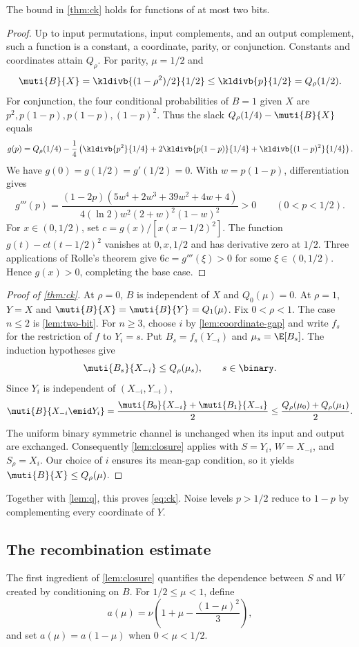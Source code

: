 \begin{lemma}\label{lem:two-bit}
The bound in \autoref{thm:ck} holds for functions of at most two bits.
\end{lemma}
\begin{proof}
Up to input permutations, input complements, and an output complement,
such a function is a constant, a coordinate, parity, or conjunction.
Constants and coordinates attain $Q_\rho$. For parity, $\mu=1/2$ and
\[
 \muti{B}{X}=\kldivb{(1-\rho^2)/2}{1/2}
 \le\kldivb{p}{1/2}=Q_\rho(1/2).
\]
For conjunction, the four conditional probabilities of $B=1$ given
$X$ are $p^2,p(1-p),p(1-p),(1-p)^2$. Thus the slack
$Q_\rho(1/4)-\muti{B}{X}$ equals
\[
 g(p)=Q_\rho(1/4)-\frac14\left(
 \kldivb{p^2}{1/4}+2\kldivb{p(1-p)}{1/4}
 +\kldivb{(1-p)^2}{1/4}\right).
\]
We have $g(0)=g(1/2)=g'(1/2)=0$. With $w=p(1-p)$,
differentiation gives
\[
 g'''(p)=\frac{(1-2p)(5w^4+2w^3+39w^2+4w+4)}
 {4(\ln2)w^2(2+w)^2(1-w)^2}>0
 \qquad(0<p<1/2).
\]
For $x\in(0,1/2)$, set $c=g(x)/[x(x-1/2)^2]$.
The function $g(t)-ct(t-1/2)^2$ vanishes at $0,x,1/2$
and has derivative zero at $1/2$. Three applications of Rolle's
theorem give $6c=g'''(\xi)>0$ for some $\xi\in(0,1/2)$.
Hence $g(x)>0$, completing the base case.
\end{proof}

\begin{proof}[Proof of \autoref{thm:ck}]
At $\rho=0$, $B$ is independent of $X$ and $Q_0(\mu)=0$.
At $\rho=1$, $Y=X$ and
$\muti{B}{X}=\muti{B}{Y}=Q_1(\mu)$.
Fix $0<\rho<1$. The case $n\le2$ is \autoref{lem:two-bit}.
For $n\ge3$, choose $i$ by \autoref{lem:coordinate-gap} and
write $f_s$ for the restriction of $f$ to $Y_i=s$.
Put $B_s=f_s(Y_{-i})$ and $\mu_s=\E[B_s]$.
The induction hypotheses give
\[
 \muti{B_s}{X_{-i}}\le Q_\rho(\mu_s),\qquad s\in\binary.
\]
Since $Y_i$ is independent of $(X_{-i},Y_{-i})$,
\[
 \muti{B}{X_{-i}\emid Y_i}
 =\frac{\muti{B_0}{X_{-i}}+\muti{B_1}{X_{-i}}}{2}
 \le\frac{Q_\rho(\mu_0)+Q_\rho(\mu_1)}2.
\]
The uniform binary symmetric channel is unchanged when its input
and output are exchanged. Consequently \autoref{lem:closure}
applies with $S=Y_i$, $W=X_{-i}$, and $S_\rho=X_i$.
Our choice of $i$ ensures its mean-gap condition, so it yields
$\muti{B}{X}\le Q_\rho(\mu)$.
\end{proof}

Together with \autoref{lem:q}, this proves \eqref{eq:ck}.
Noise levels $p>1/2$ reduce to $1-p$ by complementing every
coordinate of $Y$.

\subsection{The recombination estimate}
The first ingredient of \autoref{lem:closure} quantifies the dependence
between $S$ and $W$ created by conditioning on $B$.
For $1/2\le\mu<1$, define
\begin{equation}\label{eq:app-allowance}
 a(\mu)=\nu\left(1+\mu-\frac{(1-\mu)^2}{3}\right),
\end{equation}
and set $a(\mu)=a(1-\mu)$ when $0<\mu<1/2$.

